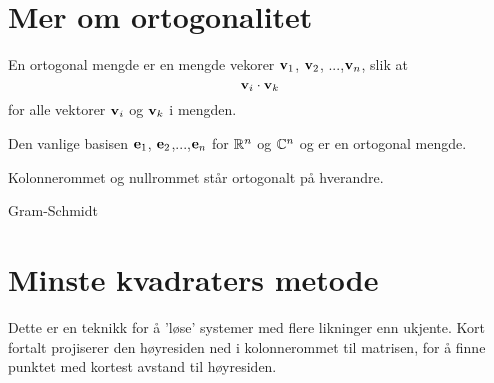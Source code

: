 \section*{Mer om ortogonalitet}
En ortogonal mengde er en mengde vekorer $\mathbf{v}_1$, $\mathbf{v}_2$, ...,$\mathbf{v}_n$, slik at
\[
\mathbf{v}_i \cdot \mathbf{v}_k
\]
for alle vektorer $\mathbf{v}_i$ og $\mathbf{v}_k$ i mengden. 
\begin{ex}
Den vanlige basisen $\mathbf{e}_1$, $\mathbf{e}_2$,...,$\mathbf{e}_n$ for $\mathbb{R}^n$ og $\mathbb{C}^n$ og  er en ortogonal mengde.
\end{ex}
\begin{ex}
Kolonnerommet og nullrommet står ortogonalt på hverandre.
\end{ex}
\begin{ex}
Gram-Schmidt
\end{ex}

\section*{Minste kvadraters metode}
Dette er en teknikk for å 'løse' systemer med flere likninger enn ukjente. Kort fortalt projiserer den høyresiden ned i kolonnerommet til matrisen, for å finne punktet med kortest avstand til høyresiden.

\kapittelslutt
